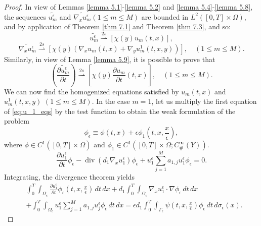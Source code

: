 \begin{proof}
In view of Lemmas \eqref{lemma 5.1}-\eqref{lemma 5.2} and \eqref{lemma 5.4}-\eqref{lemma 5.8}, the sequences $\widetilde{u_{m}^{\epsilon}}$ and $\widetilde{\nabla_{x} u_{m}^{\epsilon}}(1 \leq m \leq M)$ are bounded in $L^{2}([0, T] \times \Omega)$, and by application of Theorem \eqref{thm 7.1} and Theorem \eqref{thm 7.3}, and so:
\begin{equation}
\widetilde{u_{m}^{\epsilon}}  \overset{2s}{\rightharpoonup}
\left[\chi(y) u_{m}(t, x)\right],
\end{equation}
\begin{equation}
\widetilde{\nabla_{x} u_{m}^{\epsilon}}
\overset{2s}{\rightharpoonup}
\left[\chi(y)\left(\nabla_{x} u_{m}(t, x)+\right.\right.\left.\left.\nabla_{y} u_{m}^{1}(t, x, y)\right)\right], \quad (1 \leq m \leq M).
\end{equation}
Similarly, in view of Lemma \eqref{lemma 5.9}, it is possible to prove that
\begin{equation}
\left(\widetilde{\frac{\partial u_{m}^{\epsilon}}{\partial t}}\right)
\overset{2s}{\rightharpoonup}
\left[\chi(y) \frac{\partial u_{m}}{\partial t}(t, x)\right],  \quad (1 \leq m \leq M).
\end{equation}
We can now find the homogenized equations satisfied by $u_{m}(t, x)$ and $u_{m}^{1}(t, x, y)$ $(1 \leq m \leq M)$.
In the case $m=1$, let us multiply the first equation of \eqref{eq:u_1_eqs} by the test function to obtain the weak formulation of the problem
$$
\phi_{\epsilon} \equiv \phi(t, x)+\epsilon \phi_{1}\left(t, x, \frac{x}{\epsilon}\right),
$$
where $\phi \in C^{1}([0, T] \times \bar{\Omega})$ and $\phi_{1} \in C^{1}\left([0, T] \times \bar{\Omega} ; C_{\#}^{\infty}(Y)\right)$. 
\begin{equation*}
    \frac{\partial u_{1}^{\epsilon}}{\partial t}\phi_{\epsilon}-\operatorname{div}\left(d_{1} \nabla_{x} u_{1}^{\epsilon}\right)\phi_{\epsilon}+u_{1}^{\epsilon} \sum_{j=1}^{M} a_{1, j} u_{1}^{\epsilon}\phi_{\epsilon}=0.
\end{equation*}
Integrating, the divergence theorem yields
\begin{equation}
  \begin{aligned}
&\int_{0}^{T} \int_{\Omega_{\epsilon}} \frac{\partial u_{1}^{\epsilon}}{\partial t} \phi_{\epsilon}\left(t, x, \frac{x}{\epsilon}\right) \, d  t \, d  x+d_{1} \int_{0}^{T} \int_{\Omega_{\epsilon}} \nabla_{x} u_{1}^{\epsilon} \cdot \nabla \phi_{\epsilon} \, d  t \, d  x \\
&+\int_{0}^{T} \int_{\Omega_{\epsilon}} u_{1}^{\epsilon} \sum_{j=1}^{M} a_{1, j} u_{j}^{\epsilon} \phi_{\epsilon} \, d  t \, d  x=\epsilon d_{1} \int_{0}^{T} \int_{\Gamma_{\epsilon}} \psi\left(t, x, \frac{x}{\epsilon}\right) \phi_{\epsilon} \, d  t \, d  \sigma_{\epsilon}(x).

\end{aligned}
\end{equation}
\end{proof}
